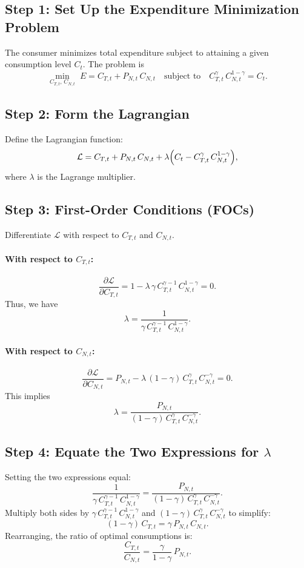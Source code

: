 \documentclass[a4paper,12pt]{article} %
\theoremstyle{nonitalic}
\begin{document}
\subsection*{Step 1: Set Up the Expenditure Minimization Problem}
The consumer minimizes total expenditure subject to attaining a given consumption level $C_t$. The problem is
\[
\min_{C_{T,t},\,C_{N,t}} \; E = C_{T,t} + P_{N,t}\,C_{N,t} \quad \text{subject to} \quad C_{T,t}^{\gamma}\,C_{N,t}^{1-\gamma} = C_t.
\]

\subsection*{Step 2: Form the Lagrangian}
Define the Lagrangian function:
\[
\mathcal{L} = C_{T,t} + P_{N,t}\,C_{N,t} + \lambda \Bigl(C_t - C_{T,t}^{\gamma}\,C_{N,t}^{1-\gamma}\Bigr),
\]
where $\lambda$ is the Lagrange multiplier.

\subsection*{Step 3: First-Order Conditions (FOCs)}
Differentiate $\mathcal{L}$ with respect to $C_{T,t}$ and $C_{N,t}$.

\paragraph{With respect to \(C_{T,t}\):}
\[
\frac{\partial \mathcal{L}}{\partial C_{T,t}} = 1 - \lambda\,\gamma\, C_{T,t}^{\gamma-1}\,C_{N,t}^{1-\gamma} = 0.
\]
Thus, we have
\[
\lambda = \frac{1}{\gamma\, C_{T,t}^{\gamma-1}\,C_{N,t}^{1-\gamma}}.
\]

\paragraph{With respect to \(C_{N,t}\):}
\[
\frac{\partial \mathcal{L}}{\partial C_{N,t}} = P_{N,t} - \lambda\,(1-\gamma)\, C_{T,t}^{\gamma}\, C_{N,t}^{-\gamma} = 0.
\]
This implies
\[
\lambda = \frac{P_{N,t}}{(1-\gamma)\, C_{T,t}^{\gamma}\, C_{N,t}^{-\gamma}}.
\]

\subsection*{Step 4: Equate the Two Expressions for \(\lambda\)}
Setting the two expressions equal:
\[
\frac{1}{\gamma\, C_{T,t}^{\gamma-1}\,C_{N,t}^{1-\gamma}} = \frac{P_{N,t}}{(1-\gamma)\, C_{T,t}^{\gamma}\, C_{N,t}^{-\gamma}}.
\]
Multiply both sides by $\gamma\, C_{T,t}^{\gamma-1}\,C_{N,t}^{1-\gamma}$ and $(1-\gamma)\, C_{T,t}^{\gamma}\, C_{N,t}^{-\gamma}$ to simplify:
\[
(1-\gamma)\, C_{T,t} = \gamma\, P_{N,t}\, C_{N,t}.
\]
Rearranging, the ratio of optimal consumptions is:
\[
\frac{C_{T,t}}{C_{N,t}} = \frac{\gamma}{1-\gamma}\,P_{N,t}.
\]
\end{document}
